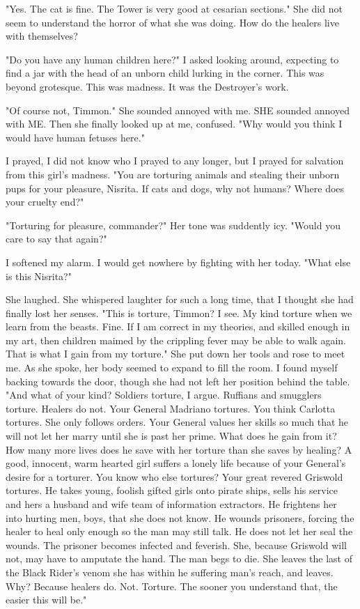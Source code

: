 \documentclass{article}
\begin{document}
"Yes. The cat is fine. The Tower is very good at cesarian sections." She did not seem to understand the horror of what she was doing. How do the healers live with themselves?

"Do you have any human children here?" I asked looking around, expecting to find a jar with the head of an unborn child lurking in the corner. This was beyond grotesque. This was madness. It was the Destroyer's work.

"Of course not, Timmon." She sounded annoyed with me. SHE sounded annoyed with ME. Then she finally looked up at me, confused. "Why would you think I would have human fetuses here."

I prayed, I did not know who I prayed to any longer, but I prayed for salvation from this girl's madness. "You are torturing animals and stealing their unborn pups for your pleasure, Nisrita. If cats and dogs, why not humans? Where does your cruelty end?"

"Torturing for pleasure, commander?" Her tone was suddently icy. "Would you care to say that again?"

I softened my alarm. I would get nowhere by fighting with her today. "What else is this Nisrita?"

She laughed. She whispered laughter for such a long time, that I thought she had finally lost her senses. "This is torture, Timmon? I see. My kind torture when we learn from the beasts. Fine. If I am correct in my theories, and skilled enough in my art, then children maimed by the crippling fever may be able to walk again. That is what I gain from my torture." She put down her tools and rose to meet me. As she spoke, her body seemed to expand to fill the room. I found myself backing towards the door, though she had not left her position behind the table. "And what of your kind? Soldiers torture, I argue. Ruffians and smugglers torture. Healers do not. Your General Madriano tortures. You think Carlotta tortures. She only follows orders. Your General values her skills so much that he will not let her marry until she is past her prime. What does he gain from it? How many more lives does he save with her torture than she saves by healing? A good, innocent, warm hearted girl suffers a lonely life because of your General's desire for a torturer. You know who else tortures? Your great revered Griswold tortures. He takes young, foolish gifted girls onto pirate ships, sells his service and hers a husband and wife team of information extractors. He frightens her into hurting men, boys, that she does not know. He wounds prisoners, forcing the healer to heal only enough so the man may still talk. He does not let her seal the wounds. The prisoner becomes infected and feverish. She, because Griswold will not, may have to amputate the hand. The man begs to die. She leaves the last of the Black Rider's venom she has within he suffering man's reach, and leaves. Why? Because healers do. Not. Torture. The sooner you understand that, the easier this will be."
\end{document}
